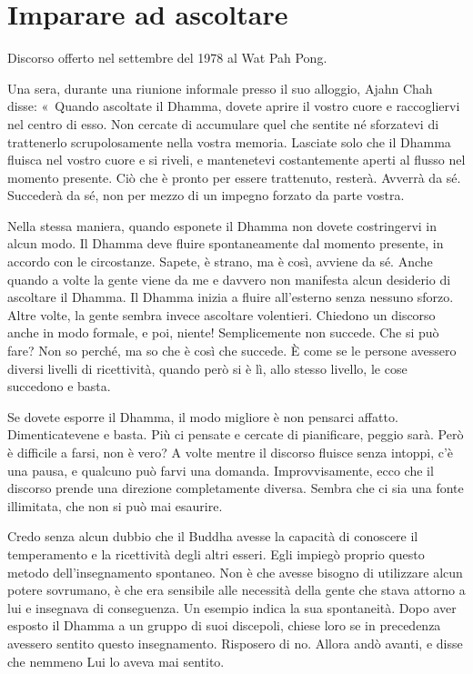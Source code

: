 \chapter{Imparare ad ascoltare}

\begin{openingQuote}
  \centering

  Discorso offerto nel settembre del 1978 al Wat Pah Pong.
\end{openingQuote}

Una sera, durante una riunione informale presso il suo alloggio, Ajahn
Chah disse: «~Quando ascoltate il Dhamma, dovete aprire il vostro cuore
e raccogliervi nel centro di esso. Non cercate di accumulare quel che
sentite né sforzatevi di trattenerlo scrupolosamente nella vostra
memoria. Lasciate solo che il Dhamma fluisca nel vostro cuore e si
riveli, e mantenetevi costantemente aperti al flusso nel momento
presente. Ciò che è pronto per essere trattenuto, resterà. Avverrà da
sé. Succederà da sé, non per mezzo di un impegno forzato da parte
vostra.

Nella stessa maniera, quando esponete il Dhamma non dovete costringervi
in alcun modo. Il Dhamma deve fluire spontaneamente dal momento
presente, in accordo con le circostanze. Sapete, è strano, ma è così,
avviene da sé. Anche quando a volte la gente viene da me e davvero non
manifesta alcun desiderio di ascoltare il Dhamma. Il Dhamma inizia a
fluire all'esterno senza nessuno sforzo. Altre volte, la gente sembra
invece ascoltare volentieri. Chiedono un discorso anche in modo formale,
e poi, niente! Semplicemente non succede. Che si può fare? Non so
perché, ma so che è così che succede. È come se le persone avessero
diversi livelli di ricettività, quando però si è lì, allo stesso
livello, le cose succedono e basta.

Se dovete esporre il Dhamma, il modo migliore è non pensarci affatto.
Dimenticatevene e basta. Più ci pensate e cercate di pianificare, peggio
sarà. Però è difficile a farsi, non è vero? A volte mentre il discorso
fluisce senza intoppi, c'è una pausa, e qualcuno può farvi una domanda.
Improvvisamente, ecco che il discorso prende una direzione completamente
diversa. Sembra che ci sia una fonte illimitata, che non si può mai
esaurire.

Credo senza alcun dubbio che il Buddha avesse la capacità di conoscere
il temperamento e la ricettività degli altri esseri. Egli impiegò
proprio questo metodo dell'insegnamento spontaneo. Non è che avesse
bisogno di utilizzare alcun potere sovrumano, è che era sensibile alle
necessità della gente che stava attorno a lui e insegnava di
conseguenza. Un esempio indica la sua spontaneità. Dopo aver esposto il
Dhamma a un gruppo di suoi discepoli, chiese loro se in precedenza
avessero sentito questo insegnamento. Risposero di no. Allora andò
avanti, e disse che nemmeno Lui lo aveva mai sentito.

